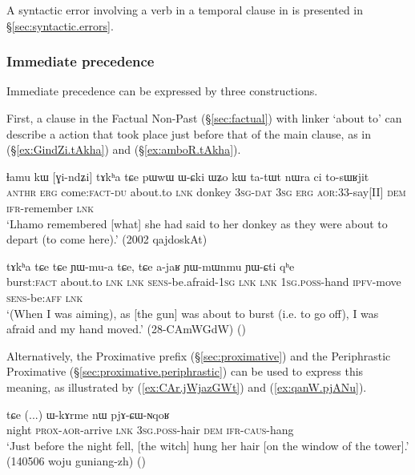 A syntactic error involving a verb in a temporal clause in   is presented in §\ref{sec:syntactic.errors}.

 \subsubsection{Immediate precedence}
Immediate precedence can be expressed by three constructions.

First, a clause in the Factual Non-Past (§\ref{sec:factual}) with linker  `about to' can describe a action that took place just before that of the main clause, as in (§\ref{ex:GindZi.tAkha}) and (§\ref{ex:amboR.tAkha}).
 
\begin{exe}
\ex \label{ex:GindZi.tAkha}
\gll ɬamu kɯ [ɣi-ndʑi] tɤkʰa tɕe pɯwɯ ɯ-ɕki ɯʑo kɯ ta-tɯt nɯra ci to-sɯʁjit \\
\textsc{anthr} \textsc{erg} come:\textsc{fact}-\textsc{du} about.to \textsc{lnk} donkey \textsc{3sg}-\textsc{dat} \textsc{3sg} \textsc{erg} \textsc{aor}:3\fl{}3-say[II] \textsc{dem} \textsc{ifr}-remember \textsc{lnk} \\
\glt  `Lhamo remembered [what] she had said to her donkey as they were about to depart (to come here).' (2002 qajdoskAt)
\end{exe}

\begin{exe}
\ex \label{ex:amboR.tAkha}
\gll [amboʁ] tɤkʰa tɕe tɕe ɲɯ-mu-a tɕe, tɕe a-jaʁ ɲɯ-mɯnmu ɲɯ-ɕti qʰe  \\
burst:\textsc{fact}  about.to \textsc{lnk}  \textsc{lnk} \textsc{sens}-be.afraid-\textsc{1sg}  \textsc{lnk}  \textsc{lnk} \textsc{1sg}.\textsc{poss}-hand \textsc{ipfv}-move \textsc{sens}-be:\textsc{aff} \textsc{lnk} \\
\glt  `(When I was aiming), as [the gun] was about to burst (i.e. to go off), I was afraid and my hand moved.' (28-CAmWGdW)
()
\end{exe}


Alternatively, the  Proximative prefix (§\ref{sec:proximative}) and the Periphrastic Proximative (§\ref{sec:proximative.periphrastic}) can be used to express this meaning, as illustrated by (\ref{ex:CAr.jWjazGWt}) and (\ref{ex:qanW.pjANu}).


\begin{exe}
\ex \label{ex:CAr.jWjazGWt}
 tɕe (...) ɯ-kɤrme nɯ pjɤ-ɕɯ-ɴqoʁ \\
night \textsc{prox}-\textsc{aor}-arrive \textsc{lnk} { } \textsc{3sg}.\textsc{poss}-hair \textsc{dem} \textsc{ifr}-\textsc{caus}-hang \\
\glt `Just before the night fell, [the witch] hung her hair [on the window of the tower].' (140506 woju guniang-zh)
	()
\end{exe}


